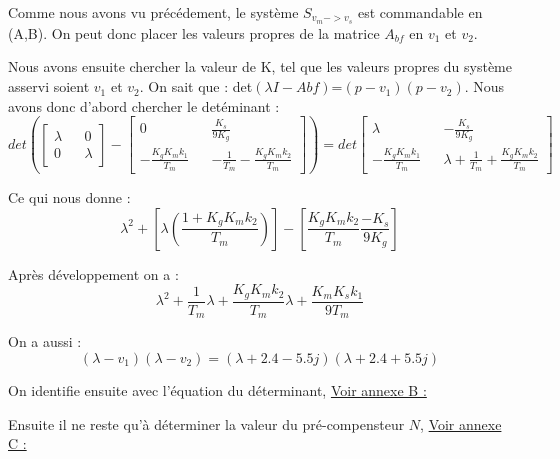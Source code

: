 \par Comme nous avons vu précédement, le système $S_{v_m->v_s}$ est commandable en (A,B). On peut donc placer les valeurs propres de la matrice $A_{bf}$ en $v_1$ et $v_2$.
\par Nous avons ensuite chercher la valeur de K, tel que les valeurs propres du système asservi soient $v_1$ et $v_2$. On sait que : det$(\lambda I-A{bf})$=$(p-v_1)(p-v_2)$. Nous avons donc d'abord chercher le detéminant :
$$det(\begin{bmatrix}\lambda && 0 \\ 0 && \lambda\end{bmatrix}-\begin{bmatrix}0 && \frac{K_s}{9K_g} \\ -\frac{K_gK_mk_1}{T_m} && -\frac{1}{T_m}-\frac{K_gK_mk_2}{T_m}\end{bmatrix})=det \begin{bmatrix}\lambda && -\frac{K_s}{9K_g} \\ -\frac{K_gK_mk_1}{T_m} && \lambda+\frac{1}{T_m}+\frac{K_gK_mk_2}{T_m}\end{bmatrix}$$
\par Ce qui nous donne :
$$\lambda^2+[\lambda(\frac{1+K_gK_mk_2}{T_m})]-[\frac{K_gK_mk_2}{T_m}\frac{-K_s}{9K_g}]$$
\par Après développement on a :
$$\lambda^2+\frac{1}{T_m}\lambda+\frac{K_gK_mk_2}{T_m}\lambda+\frac{K_mK_sk_1}{9T_m}$$
\par On a aussi : 
$$(\lambda-v_1)(\lambda-v_2)=(\lambda+2.4-5.5j)(\lambda+2.4+5.5j)$$
\par On identifie ensuite avec l'équation du déterminant,\label{K} \hyperref[annexe B]{Voir annexe B :}\\

\begin{center}


\end{center}

\par Ensuite il ne reste qu'à déterminer la valeur du pré-compensteur $N$, \label{N} \hyperref[Annexe C]{Voir annexe C :}
\begin{center}


\end{center}

